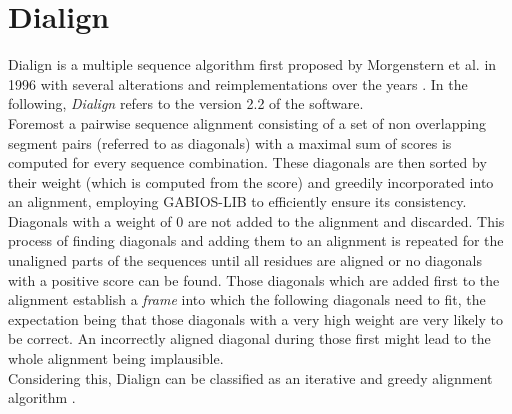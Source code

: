 %
%
 


\section{Dialign}
\label{sec:dialgin}
Dialign is a multiple sequence algorithm first proposed by Morgenstern et al. in 1996 \cite{morgenstern1996multiple} with several alterations and reimplementations over the years  \cite{abdeddaim2000speeding, morgenstern1999dialign, sub:wey:kau:mor:05, sub:kau:mor:08, morgenstern2004dialign}. In the following, \textit{Dialign} refers to the version 2.2 \cite{morgenstern2004dialign} of the software.\\
Foremost a pairwise sequence alignment consisting of a set of non overlapping segment pairs (referred to as diagonals) with a maximal sum of scores is computed for every sequence combination. These diagonals are then sorted by their weight (which is computed from the score) and greedily incorporated into an alignment, employing GABIOS-LIB to efficiently ensure its consistency. Diagonals with a weight of 0 are not added to the alignment and discarded. This process of finding diagonals and adding them to an alignment is repeated for the unaligned parts of the sequences until all residues are aligned or no diagonals with a positive score can be found. Those diagonals which are added first to the alignment establish a \textit{frame} into which the following diagonals need to fit, the expectation being that those diagonals with a very high weight are very likely to be correct. An incorrectly aligned diagonal during those first might lead to the whole alignment being implausible.\\
Considering this, Dialign can be classified as an iterative and greedy alignment algorithm \cite{morgenstern1996multiple}.


